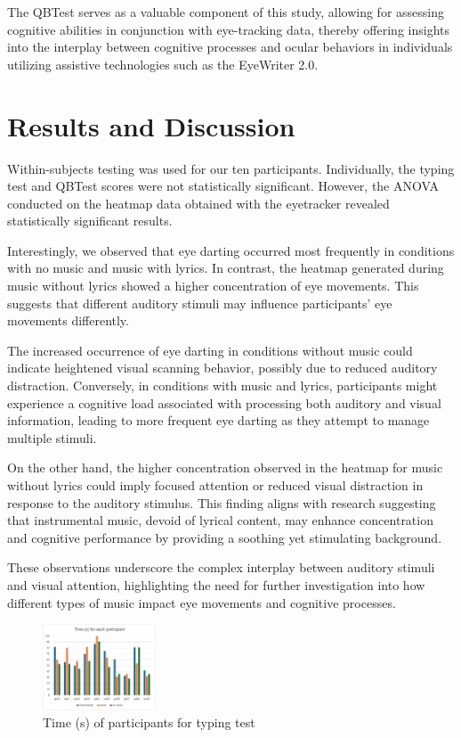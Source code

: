 \documentclass[manuscript, screen, review]{acmart} %
\begin{document}
The QBTest serves as a valuable component of this study, allowing for assessing cognitive abilities in conjunction with eye-tracking data, thereby offering insights into the interplay between cognitive processes and ocular behaviors in individuals utilizing assistive technologies such as the EyeWriter 2.0.

\section{Results and Discussion}
Within-subjects testing was used for our ten participants. Individually, the typing test and QBTest scores were not statistically significant. However, the ANOVA conducted on the heatmap data obtained with the eyetracker revealed statistically significant results.

Interestingly, we observed that eye darting occurred most frequently in conditions with no music and music with lyrics. In contrast, the heatmap generated during music without lyrics showed a higher concentration of eye movements. This suggests that different auditory stimuli may influence participants' eye movements differently.

The increased occurrence of eye darting in conditions without music could indicate heightened visual scanning behavior, possibly due to reduced auditory distraction. Conversely, in conditions with music and lyrics, participants might experience a cognitive load associated with processing both auditory and visual information, leading to more frequent eye darting as they attempt to manage multiple stimuli.

On the other hand, the higher concentration observed in the heatmap for music without lyrics could imply focused attention or reduced visual distraction in response to the auditory stimulus. This finding aligns with research suggesting that instrumental music, devoid of lyrical content, may enhance concentration and cognitive performance by providing a soothing yet stimulating background.

These observations underscore the complex interplay between auditory stimuli and visual attention, highlighting the need for further investigation into how different types of music impact eye movements and cognitive processes.


\begin{figure}
  \includegraphics[width=0.3\textwidth]{time}
  \caption{Time (s) of participants for typing test}
  \label{timeL}
\end{figure}
\end{document}
